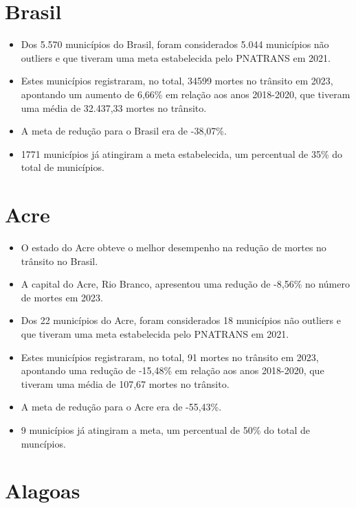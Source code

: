 \documentclass[
  letterpaper,
  DIV=11,
  numbers=noendperiod]{scrreprt}
\begin{document}
\section{Brasil}\label{brasil}

\begin{itemize}
\item
  Dos 5.570 municípios do Brasil, foram considerados 5.044 municípios
  não outliers e que tiveram uma meta estabelecida pelo PNATRANS em
  2021.
\item
  Estes municípios registraram, no total, 34599 mortes no trânsito em
  2023, apontando um aumento de 6,66\% em relação aos anos 2018-2020,
  que tiveram uma média de 32.437,33 mortes no trânsito.
\item
  A meta de redução para o Brasil era de -38,07\%.
\item
  1771 municípios já atingiram a meta estabelecida, um percentual de
  35\% do total de municípios.
\end{itemize}

\section{Acre}\label{acre}

\begin{itemize}
\item
  O estado do Acre obteve o melhor desempenho na redução de mortes no
  trânsito no Brasil.
\item
  A capital do Acre, Rio Branco, apresentou uma redução de -8,56\% no
  número de mortes em 2023.
\item
  Dos 22 municípios do Acre, foram considerados 18 municípios não
  outliers e que tiveram uma meta estabelecida pelo PNATRANS em 2021.
\item
  Estes municípios registraram, no total, 91 mortes no trânsito em 2023,
  apontando uma redução de -15,48\% em relação aos anos 2018-2020, que
  tiveram uma média de 107,67 mortes no trânsito.
\item
  A meta de redução para o Acre era de -55,43\%.
\item
  9 municípios já atingiram a meta, um percentual de 50\% do total de
  muncípios.
\end{itemize}

\section{Alagoas}\label{alagoas}
\end{document}
